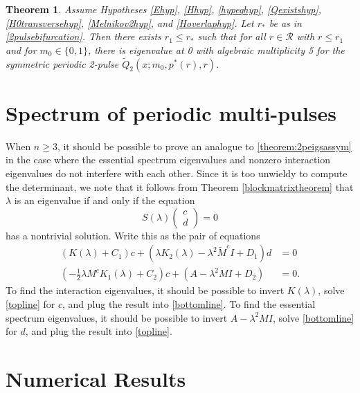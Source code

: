 \documentclass[11pt,reqno]{amsart}
\theoremstyle{plain}
\newtheorem{theorem}{Theorem}
\theoremstyle{definition}
\theoremstyle{remark}
\begin{document}
\begin{theorem}\label{theorem:2peigssym}
Assume Hypotheses \ref{Ehyp}, \ref{Hhyp}, \ref{hypeqhyp}, \ref{Qexistshyp}, \ref{H0transversehyp}, \ref{Melnikov2hyp}, and \ref{Hoverlaphyp}. Let $r_*$ be as in \cref{2pulsebifurcation}. Then there exists $r_1 \leq r_*$ such that for all $r \in \mathcal{R}$ with $r \leq r_1$ and for $m_0 \in \{0, 1\}$, there is eigenvalue at 0 with algebraic multiplicity 5 for the symmetric periodic 2-pulse $\tilde{Q}_2(x; m_0, p^*(r), r)$.
\end{theorem}

\section{Spectrum of periodic multi-pulses}

When $n \geq 3$, it should be possible to prove an analogue to \cref{theorem:2peigsassym} in the case where the essential spectrum eigenvalues and nonzero interaction eigenvalues do not interfere with each other. Since it is too unwieldy to compute the determinant, we note that it follows from Theorem \ref{blockmatrixtheorem} that $\lambda$ is an eigenvalue if and only if the equation
\[
S(\lambda) \begin{pmatrix} c\\d \end{pmatrix} = 0
\]
has a nontrivial solution. Write this as the pair of equations
\begin{align}
(K(\lambda) + C_1)c + (\lambda K_2(\lambda) - \lambda^2 \tilde{M}^c I + D_1)d &= 0 \label{topline} \\
(-\frac{1}{2} \lambda M^c K_1(\lambda) + C_2)c + (A - \lambda^2 MI + D_2) &= 0 \label{bottomline}.
\end{align}
To find the interaction eigenvalues, it should be possible to invert $K(\lambda)$, solve \cref{topline} for $c$, and plug the result into \cref{bottomline}. To find the essential spectrum eigenvalues, it should be possible to invert $A - \lambda^2 MI$, solve \cref{bottomline} for $d$, and plug the result into \cref{topline}.

\section{Numerical Results}
\end{document}
